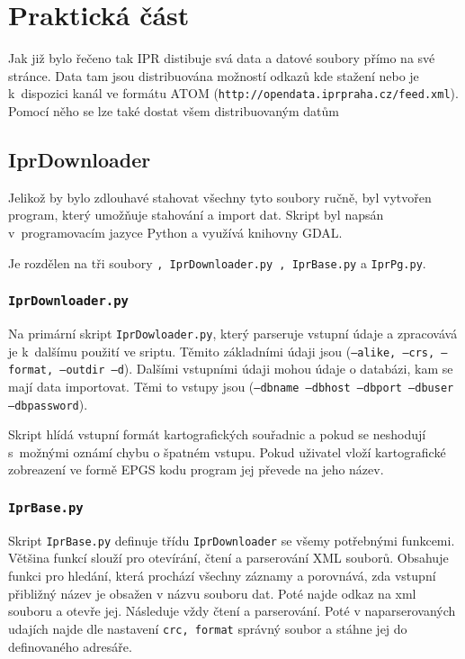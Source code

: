 \chapter{Praktická část}
\label{3-Praktická část}

Jak již bylo řečeno tak IPR distibuje svá data a datové soubory přímo na své 
stránce. Data tam jsou distribuována možností odkazů kde stažení nebo je
k~dispozici kanál ve formátu ATOM ({\tt http://opendata.iprpraha.cz/feed.xml}). 
Pomocí něho se lze také dostat všem distribuovaným datům 


\section{IprDownloader}
\label{Iprdownloader}
Jelikož by bylo zdlouhavé stahovat všechny tyto soubory ručně, byl vytvořen 
program, který umožňuje stahování a import dat. Skript byl napsán 
v~programovacím jazyce Python a využívá knihovny GDAL. 

Je rozdělen na tři soubory 
{\tt , IprDownloader.py , IprBase.py} a {\tt IprPg.py}.


\subsection{{\tt IprDownloader.py}}
Na primární skript {\tt IprDowloader.py}, který parseruje vstupní údaje a 
zpracovává je k~dalšímu použití ve sriptu. Těmito základními údaji jsou 
({\tt --alike, --crs, --format, --outdir --d}). Dalšími vstupními údaji mohou 
údaje o databázi, kam se mají data importovat. Těmi to vstupy jsou 
({\tt --dbname --dbhost --dbport --dbuser --dbpassword}).

Skript hlídá vstupní formát kartografických souřadnic a pokud se neshodují 
s~možnými oznámí chybu o špatném vstupu. Pokud uživatel vloží kartografické 
zobreazení ve formě EPGS kodu program jej převede na jeho název. 


\subsection{{\tt IprBase.py}}
Skript {\tt IprBase.py} definuje třídu {\tt IprDownloader} se všemy 
potřebnými funkcemi. Většina funkcí slouží pro otevírání, čtení a parserování
XML souborů. Obsahuje funkci pro hledání, která prochází všechny záznamy a 
porovnává, zda vstupní přibližný název je obsažen v názvu souboru dat. Poté 
najde odkaz na xml souboru a otevře jej. Následuje vždy čtení a parserování. 
Poté v naparserovaných udajích najde dle nastavení {\tt crc, format} správný soubor 
a stáhne jej do definovaného adresáře.


